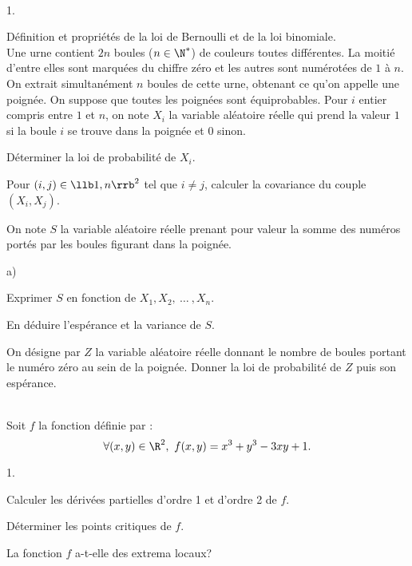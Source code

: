 \documentclass[11pt]{article}%
\begin{document}
\newpage


\begin{exerciceAP}~
  \begin{noliste}{1.}
    \setlength{\itemsep}{2mm}
  \item Définition et propriétés de la loi de Bernoulli et de la loi
    binomiale.\\[.2cm]
    Une urne contient $2n$ boules ($n \in \N^*$) de couleurs
    toutes différentes. La moitié d'entre elles sont marquées du
    chiffre zéro et les autres sont numérotées de $1$ à $n$.\\
    On extrait simultanément $n$ boules de cette urne, obtenant ce
    qu'on appelle une poignée. On suppose que toutes les poignées sont
    équiprobables. Pour $i$ entier compris entre $1$ et $n$, on note
    $X_i$ la variable aléatoire réelle qui prend la valeur $1$ si la
    boule $i$ se trouve dans la poignée et $0$ sinon.
  \item Déterminer la loi de probabilité de $X_i$.
  \item Pour $(i,j) \in \llb 1 , n \rrb^2$ tel que $i \neq j$,
    calculer la covariance du couple $(X_i , X_j)$.
  \item On note $S$ la variable aléatoire réelle prenant pour valeur
    la somme des numéros portés par les boules figurant dans la
    poignée.
    \begin{noliste}{a)}
    \setlength{\itemsep}{2mm}
    \item Exprimer $S$ en fonction de $X_1 , X_2 ,\ \dots\ , X_n$.
    \item En déduire l'espérance et la variance de $S$.
    \end{noliste}
  \item On désigne par $Z$ la variable aléatoire réelle donnant le
    nombre de boules portant le numéro zéro au sein de la
    poignée. Donner la loi de probabilité de $Z$ puis son espérance.
  \end{noliste}
\end{exerciceAP}


\begin{exerciceSP}~\\
  Soit $f$ la fonction définie par :
  \[
 \forall (x ,y) \in \R^2,\ f(x,y) = x^3 + y^3 - 3 xy + 1.
\] \begin{noliste}{1.}
    \setlength{\itemsep}{2mm}
  \item Calculer les dérivées partielles d'ordre 1 et d'ordre 2 de $f$.
  \item Déterminer les points critiques de $f$.
  \item La fonction $f$ a-t-elle des extrema locaux?
  \end{noliste}
\end{exerciceSP}
\end{document}
